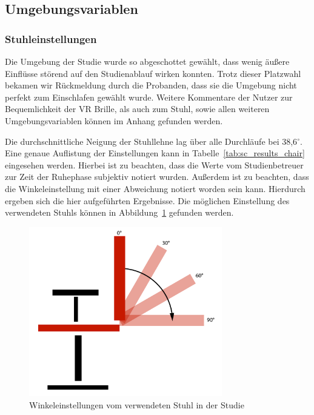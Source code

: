 \subsection{Umgebungsvariablen}
\subsubsection{Stuhleinstellungen}

Die Umgebung der Studie wurde so abgeschottet gewählt, dass wenig äußere Einflüsse störend auf den Studienablauf wirken konnten. Trotz dieser Platzwahl bekamen wir Rückmeldung durch die Probanden, dass sie die Umgebung nicht perfekt zum Einschlafen gewählt wurde. Weitere Kommentare der Nutzer zur Bequemlichkeit der VR Brille, als auch zum Stuhl, sowie allen weiteren Umgebungsvariablen können im Anhang gefunden werden.

Die durchschnittliche Neigung der Stuhllehne lag über alle Durchläufe bei 38,6$^\circ$. Eine genaue Auflistung der Einstellungen kann in Tabelle~\ref{tab:sc_results_chair} eingesehen werden. Hierbei ist zu beachten, dass die Werte vom Studienbetreuer zur Zeit der Ruhephase subjektiv notiert wurden. Außerdem ist zu beachten, dass die Winkeleinstellung mit einer Abweichung notiert worden sein kann. Hierdurch ergeben sich die hier aufgeführten Ergebnisse. Die möglichen Einstellung des verwendeten Stuhls können in Abbildung~\ref{fig:chair_backrest} gefunden werden.

\begin{figure}[H]
	\centering
	\includegraphics[width=0.75\textwidth]{./images/chair}
	\caption{Winkeleinstellungen vom verwendeten Stuhl in der Studie}
	\label{fig:chair_backrest}
\end{figure}


